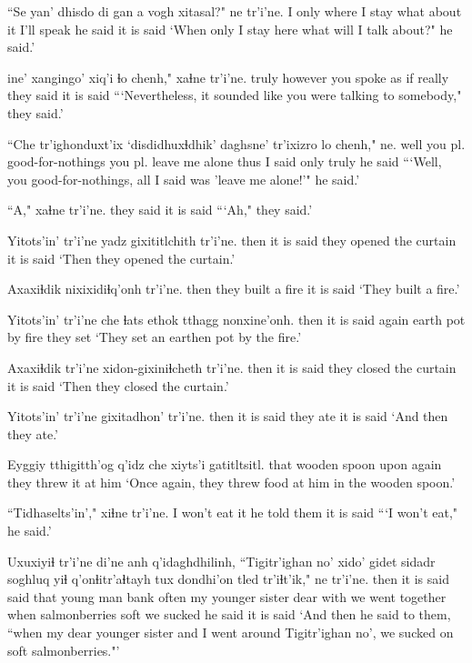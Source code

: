 \documentclass[12pt]{article}
\begin{document}
\gll ``Se yan' {dhisdo di} gan a vogh xitasal?"   ne  tr'i'ne.
I only {where I stay} what {} {about it} {I'll speak} {he said}  {it is said}
\glt `When only I stay here what will I talk about?" he said.'
\glend

 ine' xangingo' xiq'i {ɬo chenh,"} xaɬne  tr'i'ne.
truly however {you spoke} {as if} really  {they said} {it is said}
\glt ```Nevertheless, it sounded like you were talking to somebody," they said.'
\glend

\gll ``Che tr'ighonduxt'ix  `disdidhuxɬdhik' daghsne' tr'ixizro {lo chenh,"} ne.
well {you pl. good-for-nothings} {you pl. leave me alone} {thus I said} only  truly  {he said}
\glt ```Well, you good-for-nothings, all I said was 'leave me alone!'" he said.'
\glend

\gll ``A," xaɬne  tr'i'ne.
{} {they said} {it is said}
\glt ```Ah," they said.'
\glend

\gll Yitots'in' tr'i'ne {yadz gixititlchith}  tr'i'ne.
then  {it is said} {they opened the curtain} {it is said}
\glt `Then they opened the curtain.'
\glend

\gll Axaxiɬdik nixixidiɬq'onh tr'i'ne.
then  {they built a fire} {it is said}
\glt `They built a fire.'
\glend

\gll Yitots'in' tr'i'ne che ɬats ethok tthagg nonxine'onh.
then  {it is said} again earth pot {by fire} {they set}
\glt `They set an earthen pot by the fire.'
\glend

\gll Axaxiɬdik tr'i'ne xidon-gixiniɬcheth tr'i'ne.
then  {it is said} {they closed the curtain} {it is said}
\glt `Then they closed the curtain.'
\glend

\gll Yitots'in' tr'i'ne gixitadhon' tr'i'ne.
then  {it is said} {they ate} {it is said}
\glt `And then they ate.'
\glend

\gll Eyggiy tthigitth'og  q'idz che {xiyts'i gatitltsitl.}
that  {wooden spoon} upon again {they threw it at him}
\glt `Once again, they threw food at him in the wooden spoon.'
\glend

\gll ``Tidhaselts'in'," xiɬne  tr'i'ne.
{I won't eat it} {he told them} {it is said}
\glt  ```I won't eat," he said.'
\glend

\gll Uxuxiyiɬ tr'i'ne di'ne anh q'idaghdhilinh, {``Tigitr'ighan no'} xido' gidet sidadr  soghluq yiɬ q'onɬitr'aɬtayh tux dondhi'on tled tr'iɬt'ik," ne  tr'i'ne.
then  {it is said} said that {young man} {} bank often {my younger sister} dear  with {we went together} when salmonberries  soft {we sucked} {he said}  {it is said}
\glt `And then he said to them, ``when my dear younger sister and I went around Tigitr'ighan no', we sucked on soft salmonberries."'
\glend
\end{document}
